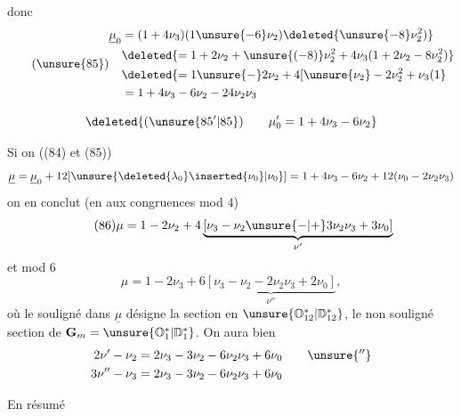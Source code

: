 donc
\[
\tag{\unsure{85}}
\begin{aligned}
\underline{\mu}_0&=(1+4\nu_3)(1\unsure{-6}\nu_2)\deleted{\unsure{-8}\nu_2^2)}\\
&\deleted{=1+2\nu_2+\unsure{(-8)}\nu_2^2+4\nu_3(1+2\nu_2-8\nu_2^2)}\\
&\deleted{=1\unsure{-}2\nu_2+4[\unsure{\nu_2}-2\nu_2^2+\nu_3(1}\\
&=1+4\nu_3-6\nu_2-24\nu_2\nu_3
\end{aligned}
\]

\[
\deleted{(\unsure{85'|85})\qquad\mu'_0=1+4\nu_3-6\nu_2}
\]



Si on  ((84) et (85))
\[
\underline{\mu}=\underline{\mu}_0+12[\unsure{\deleted{\lambda_0}\inserted{\nu_0}|\nu_0}]
=1+4\nu_3-6\nu_2+12(\nu_0-2\nu_2\nu_3)
\]
on en conclut (en  aux congruences mod $4$)
\[
\tag{86}
\mu=1-2\nu_2+4\underbrace{[\nu_3-\nu_2\unsure{-|+}3\nu_2\nu_3+3\nu_0]}_{\nu'}
\]
et   mod $6$
\[
\tag{87}
\mu=1-2\nu_3+6\underbrace{[\nu_3-\nu_2-2\nu_2\nu_3+2\nu_0]}_{\nu''},
\]
où le souligné dans $\underline{\mu}$ désigne la section en $\unsure{\mathbb O_{12}^*|\mathbb D_{12}^*}$, le non souligné \inserted{$\mu$}   section  de $\mathbf G_m=\unsure{\mathbb O_1^*|\mathbb D_1^*}$. On aura bien
\[
\begin{aligned}
2\nu'-\nu_2&=2\nu_3-3\nu_2-6\nu_2\nu_3+6\nu_0\qquad\unsure{''}\\
3\nu''-\nu_3&=2\nu_3-3\nu_2-6\nu_2\nu_3+6\nu_0
\end{aligned}
\]

En résumé

